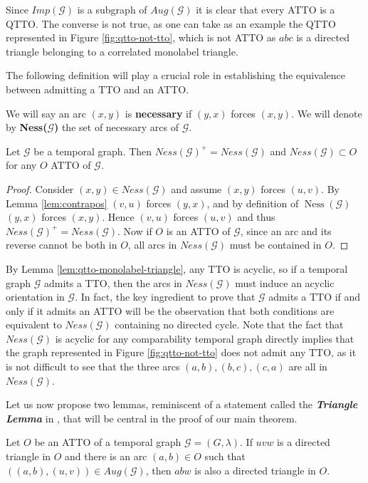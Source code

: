 \documentclass[runningheads]{llncs}
\def\mG{\mathcal{G}}
\DeclareMathOperator{\Ness}{Ness}
\newcommand{\bfit}[1]{\textbf{\textit{#1}}}
\begin{document}
Since $Imp(\mG)$ is a subgraph of $Aug(\mG)$ it is clear that every ATTO is a QTTO.  The converse is not true, as one can take as an example the QTTO represented in Figure \ref{fig:qtto-not-tto}, which is not ATTO as $abc$ is a directed triangle belonging to a correlated monolabel triangle.

The following definition will play a crucial role in establishing the equivalence between admitting a TTO and an ATTO.

\begin{definition}
We will say an arc $(x,y)$ is \textbf{necessary} if $(y,x)$ forces $(x,y)$. We will denote by \textbf{Ness($\mathcal{G}$)} the set of necessary arcs of $\mathcal{G}$. 
\end{definition}

\begin{lemma}\label{lem:necessary}
Let $\mG$ be a temporal graph. Then $Ness(\mG)^+=Ness(\mG)$ and $Ness(\mG)\subset O$ for any $O$ ATTO of $\mG$. 
\end{lemma}
\begin{proof}
Consider $(x,y) \in Ness(\mathcal{G})$ and assume $(x,y)$ forces $(u,v)$. By Lemma \ref{lem:contrapos} $(v,u)$ forces $(y,x)$, and by definition of $\Ness(\mG)$ $(y,x)$ forces $(x,y)$. Hence $(v,u)$ forces $(u,v)$ and thus $Ness(\mathcal{G})^+ = Ness(\mathcal{G})$. Now if $O$ is an ATTO of $\mathcal{G}$, since an arc and its reverse cannot be both in $O$, all arcs in $Ness(\mathcal{G})$ must be contained in $O$.
\end{proof}

By Lemma \ref{lem:qtto-monolabel-triangle}, any TTO is acyclic, so if a temporal graph $\mG$ admits a TTO, then the arcs in $Ness(\mathcal{G})$ must induce an acyclic orientation in $\mG$. In fact, the key ingredient to prove that $\mG$ admits a TTO if and only if it admits an ATTO will be the observation that both conditions are equivalent to $Ness(\mG)$ containing no directed cycle. Note that the fact that $Ness(\mG)$ is acyclic for any comparability temporal graph directly  implies that the graph represented in Figure \ref{fig:qtto-not-tto} does not admit any TTO, as it is not difficult to see that the three arcs $(a,b), (b,c),(c,a)$ are all in $Ness(\mathcal{G})$.%

Let us now propose two lemmas, reminiscent of a statement called the \bfit{Triangle Lemma} in \cite{Golumbic2nd}, that will be central in the proof of our main theorem.

\begin{lemma}\label{lem:triangle}Let $O$ be an ATTO of a temporal graph $\mathcal{G}=(G,\lambda)$. If $uvw$ is a directed triangle in $O$ and there is an arc $(a,b) \in O$ such that $((a,b),(u,v)) \in Aug(\mathcal{G})$, then $abw$ is also a directed triangle in $O$.
\end{lemma}
\end{document}
